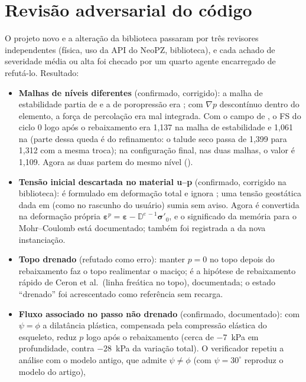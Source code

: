 \documentclass[11pt,a4paper]{article}
\newcommand{\sig}{\bm{\sigma}}
\newcommand{\eps}{\bm{\varepsilon}}
\newcommand{\D}{\mathbb{D}}
\begin{document}
\section{Revisão adversarial do código}\label{sec:review}
O projeto novo e a alteração da biblioteca passaram por três revisores independentes (física,
uso da API do NeoPZ, biblioteca), e cada achado de severidade média ou alta foi checado por um quarto
agente encarregado de refutá-lo. Resultado:
\begin{itemize}
\item \textbf{Malhas de níveis diferentes} (confirmado, corrigido): a malha de estabilidade partia de
   e a de poropressão era ; com $\nabla p$ descontínuo dentro do
  elemento, a força de percolação era mal integrada. Com o campo de , o FS do ciclo 0 logo
  após o rebaixamento era 1,137 na malha de estabilidade  e 1,061 na 
  (parte dessa queda é do refinamento: o talude seco passa de 1,399 para 1,312 com a mesma troca); na
  configuração final,  nas duas malhas, o valor é 1,109. Agora as duas partem do mesmo nível
  ().
\item \textbf{Tensão inicial descartada no material u--p} (confirmado, corrigido na biblioteca):
   é formulado em deformação total e ignora ; uma tensão
  geostática dada em  (como no rascunho do usuário) sumia sem aviso. Agora é
  convertida na deformação própria $\eps^p=\eps-\D^{e\,-1}\sig'_0$, e o significado da memória para o
  Mohr--Coulomb está documentado; também foi registrada a  da nova instanciação.
\item \textbf{Topo drenado} (refutado como erro): manter $p=0$ no topo depois do rebaixamento faz o topo
  realimentar o maciço; é a hipótese de rebaixamento rápido de Ceron et al.\ (linha freática no topo),
  documentada; o estado ``drenado'' foi acrescentado como referência sem recarga.
\item \textbf{Fluxo associado no passo não drenado} (confirmado, documentado): com $\psi=\phi$ a dilatância
  plástica, compensada pela compressão elástica do esqueleto, reduz $p$ logo após o rebaixamento
  (cerca de $-7$~kPa em profundidade, contra $-28$~kPa da variação total). O verificador repetiu a
  análise com o modelo antigo, que admite $\psi\ne\phi$ (com $\psi=30^\circ$ reproduz o modelo do artigo),

\end{itemize}
\end{document}
